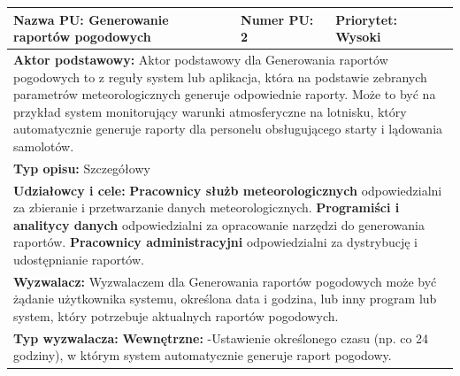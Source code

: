 \documentclass{article}
\begin{document}
\begin{center}
    \begin{center}
        \begin{tabular}{|l|l|l|}
        \hline
        \textbf{Nazwa PU:} Generowanie raportów pogodowych & \textbf{Numer PU:} 2 & \textbf{Priorytet:} Wysoki \\
        \hline
        \hline
        \multicolumn{3}{|p{\dimexpr\linewidth-2\tabcolsep-2\arrayrulewidth}|}{\textbf{Aktor podstawowy:}
        \newline 
        Aktor podstawowy dla Generowania raportów pogodowych to z reguły system lub aplikacja,
        która na podstawie zebranych parametrów meteorologicznych generuje odpowiednie raporty.
        Może to być na przykład system monitorujący warunki atmosferyczne na lotnisku,
        który automatycznie generuje raporty dla personelu obsługującego starty i lądowania samolotów.} \\
        \hline
        \hline
        \multicolumn{3}{|p{\dimexpr\linewidth-2\tabcolsep-2\arrayrulewidth}|}{\textbf{Typ opisu:} Szczegółowy} \\
        \hline
        \hline
        \multicolumn{3}{|p{\dimexpr\linewidth-2\tabcolsep-2\arrayrulewidth}|}{\textbf{Udziałowcy i cele:}
        \newline
        \textbf{Pracownicy służb meteorologicznych} odpowiedzialni za zbieranie i przetwarzanie danych meteorologicznych.
        \newline
        \textbf{Programiści i analitycy danych} odpowiedzialni za opracowanie narzędzi do generowania raportów.
        \newline
        \textbf{Pracownicy administracyjni} odpowiedzialni za dystrybucję i udostępnianie raportów.} \\
        \hline
        \hline
        \multicolumn{3}{|p{\dimexpr\linewidth-2\tabcolsep-2\arrayrulewidth}|}{\textbf{Wyzwalacz:}
        Wyzwalaczem dla Generowania raportów pogodowych może być żądanie użytkownika systemu,
        określona data i godzina, lub inny program lub system, który potrzebuje aktualnych raportów pogodowych.} \\
        \hline
        \hline
        \multicolumn{3}{|p{\dimexpr\linewidth-2\tabcolsep-2\arrayrulewidth}|}{\textbf{Typ wyzwalacza:}
        \newline
        \textbf{Wewnętrzne:}
        \newline
        -Ustawienie określonego czasu (np. co 24 godziny), w którym system automatycznie generuje raport pogodowy.
        \newline
}
\end{tabular}
\end{center}
\end{center}
\end{document}

